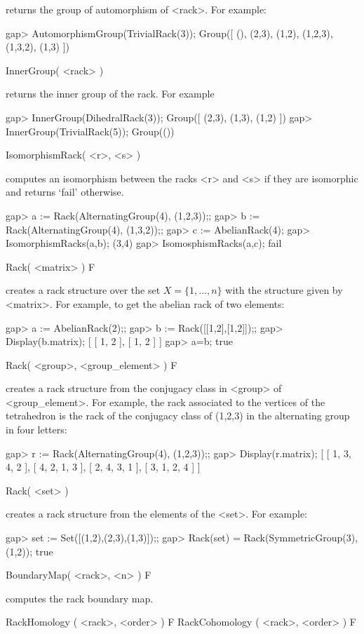 returns the group of automorphism of <rack>. For example:

\beginexample
gap> AutomorphismGroup(TrivialRack(3));                  
Group([ (), (2,3), (1,2), (1,2,3), (1,3,2), (1,3) ])
\endexample

\>InnerGroup( <rack> )

returns the inner group of the rack. For example

\beginexample
gap> InnerGroup(DihedralRack(3));
Group([ (2,3), (1,3), (1,2) ])
gap> InnerGroup(TrivialRack(5)); 
Group(())
\endexample

\>IsomorphismRack( <r>, <s> )

computes  an  isomorphism  between  the  racks  <r>  and  <s> if they are
isomorphic and returns `fail' otherwise.

\beginexample
gap> a := Rack(AlternatingGroup(4), (1,2,3));;
gap> b := Rack(AlternatingGroup(4), (1,3,2));;
gap> c := AbelianRack(4);
gap> IsomorphismRacks(a,b);
(3,4)
gap> IsomosphismRacks(a,c);
fail
\endexample

\>Rack( <matrix> ) F

creates a rack structure over the set $X=\{1,...,n\}$ with the structure 
given by <matrix>. For example, to get the abelian rack of two elements:

\beginexample
gap> a := AbelianRack(2);;
gap> b := Rack([[1,2],[1,2]]);;
gap> Display(b.matrix); 
[ [  1,  2 ],
  [  1,  2 ] ]
gap> a=b;
true
\endexample

\>Rack( <group>, <group_element> ) F

creates a rack structure from the conjugacy class in <group> of 
<group_element>. For example, the rack associated to the 
vertices of the tetrahedron is the rack of the conjugacy class
of (1,2,3) in the alternating group in four letters:

\beginexample
gap> r := Rack(AlternatingGroup(4), (1,2,3));;
gap> Display(r.matrix);
[ [  1,  3,  4,  2 ],
  [  4,  2,  1,  3 ],
  [  2,  4,  3,  1 ],
  [  3,  1,  2,  4 ] ]
\endexample

\>Rack( <set> )

creates a rack structure from the elements of the <set>. For example:

\beginexample
gap> set := Set([(1,2),(2,3),(1,3)]);;
gap> Rack(set) = Rack(SymmetricGroup(3), (1,2));
true
\endexample

\>BoundaryMap( <rack>, <n> ) F 

computes the rack boundary map.

\>RackHomology ( <rack>, <order> ) F
\>RackCohomology ( <rack>, <order> ) F

